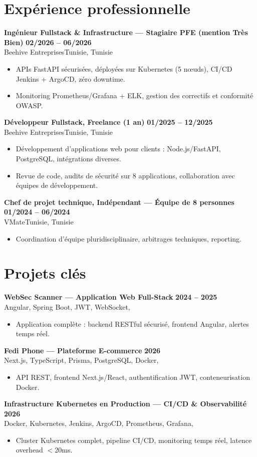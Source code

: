 \documentclass[a4paper,9pt]{article}
\newcommand{\cventry}[4]{\textbf{#1} \hfill \textbf{#4}\\[0.2pt]#2{\ifx\relax#3\relax\else, #3\fi}\par\vspace{0.3pt}}
\begin{document}
\section{Expérience professionnelle}
\cventry{Ingénieur Fullstack \& Infrastructure --- Stagiaire PFE (mention Très Bien)}{Beehive Entreprises}{Tunisie}{02/2026 -- 06/2026}
\begin{itemize}
  \item APIs FastAPI sécurisées, déployées sur Kubernetes (5 nœuds), CI/CD Jenkins + ArgoCD, zéro downtime.
  \item Monitoring Prometheus/Grafana + ELK, gestion des correctifs et conformité OWASP.
\end{itemize}
\cventry{Développeur Fullstack, Freelance (1 an)}{Beehive Entreprises}{Tunisie}{01/2025 -- 12/2025}
\begin{itemize}
  \item Développement d'applications web pour clients : Node.js/FastAPI, PostgreSQL, intégrations diverses.
  \item Revue de code, audits de sécurité sur 8 applications, collaboration avec équipes de développement.
\end{itemize}
\cventry{Chef de projet technique, Indépendant --- Équipe de 8 personnes}{VMate}{Tunisie}{01/2024 -- 06/2024}
\begin{itemize}
  \item Coordination d'équipe pluridisciplinaire, arbitrages techniques, reporting.
\end{itemize}
\section{Projets clés}
\cventry{WebSec Scanner --- Application Web Full-Stack}{Angular, Spring Boot, JWT, WebSocket}{}{2024 -- 2025}
\begin{itemize}
  \item Application complète : backend RESTful sécurisé, frontend Angular, alertes temps réel.
\end{itemize}
\cventry{Fedi Phone --- Plateforme E-commerce}{Next.js, TypeScript, Prisma, PostgreSQL, Docker}{}{2026}
\begin{itemize}
  \item API REST, frontend Next.js/React, authentification JWT, conteneurisation Docker.
\end{itemize}
\cventry{Infrastructure Kubernetes en Production --- CI/CD \& Observabilité}{Docker, Kubernetes, Jenkins, ArgoCD, Prometheus, Grafana}{}{2026}
\begin{itemize}
  \item Cluster Kubernetes complet, pipeline CI/CD, monitoring temps réel, latence overhead $<$20ms.
\end{itemize}
\end{document}
